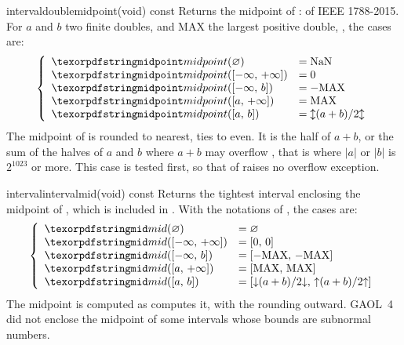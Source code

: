 \begin{defmethod}{interval}{double}{midpoint}{(void) const}
  Returns the midpoint of :  of IEEE 1788-2015. For
  $a$ and $b$ two finite doubles, and MAX the largest positive double,
  , the cases are:
\begin{equation*}
\left\{\begin{array}{ll}
\code{midpoint}(\emptyset{})&=\text{NaN}\\
\code{midpoint}(\itv{-\infty}{+\infty})&=0\\
\code{midpoint}(\itv{-\infty}{b})&=-\text{MAX}\\
\code{midpoint}(\itv{a}{+\infty})&=\text{MAX}\\
\code{midpoint}(\itv{a}{b})&=\roundNearest{(a+b)/2} \\
\end{array}\right.
\end{equation*}
  The midpoint of  is rounded to nearest, ties to even. It is the
  half of $a+b$, or the sum of the halves of $a$ and $b$ where $a+b$ may
  overflow \cite{Goualard:TOMS2014}, that is where $|a|$ or $|b|$ is
  $2^{1023}$ or more. This case is tested first, so that 
  of  raises no overflow
  exception.\newinvfive
\end{defmethod}

\begin{defmethod}{interval}{interval}{mid}{(void) const}
  Returns the tightest interval enclosing the midpoint of ,
  which is included in . With the notations of
  , the cases are:
\begin{equation*}
\left\{\begin{array}{ll}
\code{mid}(\emptyset{})&=\emptyset{}\\
\code{mid}(\itv{-\infty}{+\infty})&=\itv{0}{0}\\
\code{mid}(\itv{-\infty}{b})&=\itv{-\text{MAX}}{-\text{MAX}}\\
\code{mid}(\itv{a}{+\infty})&=\itv{\text{MAX}}{\text{MAX}}\\
\code{mid}(\itv{a}{b})&=\itv{\roundDn{(a+b)/2}}{\roundUp{(a+b)/2}}
\end{array}\right.
\end{equation*}
  The midpoint is computed as  computes it, with the
  rounding outward. GAOL~4 did not enclose the midpoint of some intervals
  whose bounds are subnormal numbers.\newinvfive
\end{defmethod}

